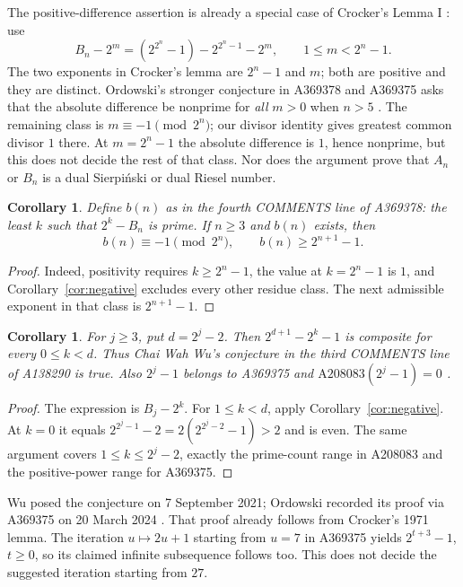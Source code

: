 \documentclass[11pt]{article}
\newtheorem{corollary}[theorem]{Corollary}
\begin{document}
The positive-difference assertion is already a special case of
Crocker's Lemma I \cite[p.~104]{crocker}: use
\[
 B_n-2^m=(2^{2^n}-1)-2^{2^n-1}-2^m,
 \qquad 1\leq m<2^n-1.
\]
The two exponents in Crocker's lemma are $2^n-1$ and $m$;
both are positive and they are distinct.
Ordowski's stronger conjecture in A369378 and A369375 asks that the
absolute difference be nonprime for \emph{all} $m>0$ when $n>5$
\cite{oeis,negative}. The remaining class is $m\equiv-1\pmod {2^n}$;
our divisor identity gives greatest common divisor $1$ there.
At $m=2^n-1$ the absolute difference is $1$, hence nonprime, but this
does not decide the rest of that class. Nor does the argument prove that
$A_n$ or $B_n$ is a dual Sierpi\'nski or dual Riesel number.

\begin{corollary}\label{cor:reverse}
Define $b(n)$ as in the fourth COMMENTS line of A369378: the least $k$
such that $2^k-B_n$ is prime. If $n\geq3$ and $b(n)$ exists, then
\[
 b(n)\equiv-1\pmod {2^n},\qquad b(n)\geq2^{n+1}-1.
\]
\end{corollary}
\begin{proof}
Indeed, positivity requires $k\geq2^n-1$, the value at $k=2^n-1$ is
$1$, and Corollary~\ref{cor:negative} excludes every other residue class.
The next admissible exponent in that class is $2^{n+1}-1$.
\end{proof}

\begin{corollary}\label{cor:wu}
For $j\geq3$, put $d=2^j-2$. Then $2^{d+1}-2^k-1$ is composite
for every $0\leq k<d$. Thus Chai Wah Wu's conjecture in the third
COMMENTS line of A138290 is true. Also $2^j-1$ belongs to A369375
and $\mathrm{A208083}(2^j-1)=0$ \cite{wu,negative,count}.
\end{corollary}
\begin{proof}
The expression is $B_j-2^k$. For $1\leq k<d$, apply
Corollary~\ref{cor:negative}. At $k=0$ it equals
$2^{2^j-1}-2=2(2^{2^j-2}-1)>2$ and is even.
The same argument covers $1\leq k\leq2^j-2$, exactly the prime-count
range in A208083 and the positive-power range for A369375.
\end{proof}
Wu posed the conjecture on 7 September 2021; Ordowski recorded its
proof via A369375 on 20 March 2024 \cite{wu}. That proof already follows
from Crocker's 1971 lemma. The iteration $u\mapsto2u+1$ starting
from $u=7$ in A369375 yields $2^{t+3}-1$, $t\geq0$, so its claimed
infinite subsequence follows too. This does not decide the suggested
iteration starting from $27$.
\end{document}
